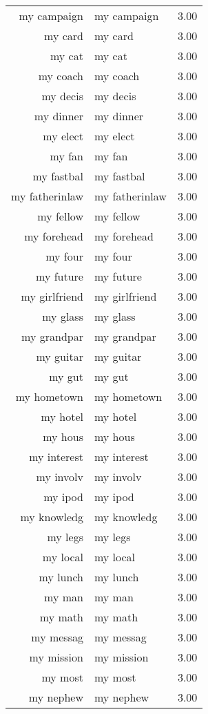 \begin{table}[ht]
\begin{tabular}{rlr}
  my campaign & my campaign & 3.00 \\ 
  my card & my card & 3.00 \\ 
  my cat & my cat & 3.00 \\ 
  my coach & my coach & 3.00 \\ 
  my decis & my decis & 3.00 \\ 
  my dinner & my dinner & 3.00 \\ 
  my elect & my elect & 3.00 \\ 
  my fan & my fan & 3.00 \\ 
  my fastbal & my fastbal & 3.00 \\ 
  my fatherinlaw & my fatherinlaw & 3.00 \\ 
  my fellow & my fellow & 3.00 \\ 
  my forehead & my forehead & 3.00 \\ 
  my four & my four & 3.00 \\ 
  my future & my future & 3.00 \\ 
  my girlfriend & my girlfriend & 3.00 \\ 
  my glass & my glass & 3.00 \\ 
  my grandpar & my grandpar & 3.00 \\ 
  my guitar & my guitar & 3.00 \\ 
  my gut & my gut & 3.00 \\ 
  my hometown & my hometown & 3.00 \\ 
  my hotel & my hotel & 3.00 \\ 
  my hous & my hous & 3.00 \\ 
  my interest & my interest & 3.00 \\ 
  my involv & my involv & 3.00 \\ 
  my ipod & my ipod & 3.00 \\ 
  my knowledg & my knowledg & 3.00 \\ 
  my legs & my legs & 3.00 \\ 
  my local & my local & 3.00 \\ 
  my lunch & my lunch & 3.00 \\ 
  my man & my man & 3.00 \\ 
  my math & my math & 3.00 \\ 
  my messag & my messag & 3.00 \\ 
  my mission & my mission & 3.00 \\ 
  my most & my most & 3.00 \\ 
  my nephew & my nephew & 3.00 \\ 

\end{tabular}
\end{table}
